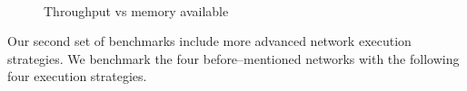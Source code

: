 \documentclass[conference]{IEEEtran}
\begin{document}
  \begin{figure}[h!t]
    \centering
    \\

    \caption{Throughput vs memory available
    }
    \label{fig:final_results}
  \end{figure}

  Our second set of benchmarks include more advanced network execution
  strategies.  We benchmark the four before--mentioned networks with
  the following four execution strategies.
\end{document}
